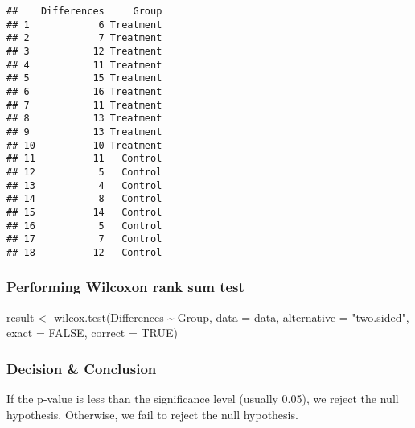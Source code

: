 \documentclass[
]{article}
\newenvironment{Shaded}{\begin{snugshade}}{\end{snugshade}}
\newcommand{\AttributeTok}[1]{\textcolor[rgb]{0.77,0.63,0.00}{#1}}
\newcommand{\ConstantTok}[1]{\textcolor[rgb]{0.00,0.00,0.00}{#1}}
\newcommand{\FunctionTok}[1]{\textcolor[rgb]{0.00,0.00,0.00}{#1}}
\newcommand{\NormalTok}[1]{#1}
\newcommand{\OtherTok}[1]{\textcolor[rgb]{0.56,0.35,0.01}{#1}}
\newcommand{\SpecialCharTok}[1]{\textcolor[rgb]{0.00,0.00,0.00}{#1}}
\newcommand{\StringTok}[1]{\textcolor[rgb]{0.31,0.60,0.02}{#1}}
\begin{document}
\begin{verbatim}
##    Differences     Group
## 1            6 Treatment
## 2            7 Treatment
## 3           12 Treatment
## 4           11 Treatment
## 5           15 Treatment
## 6           16 Treatment
## 7           11 Treatment
## 8           13 Treatment
## 9           13 Treatment
## 10          10 Treatment
## 11          11   Control
## 12           5   Control
## 13           4   Control
## 14           8   Control
## 15          14   Control
## 16           5   Control
## 17           7   Control
## 18          12   Control
\end{verbatim}

\hypertarget{performing-wilcoxon-rank-sum-test}{%
\subsubsection{Performing Wilcoxon rank sum
test}\label{performing-wilcoxon-rank-sum-test}}

\begin{Shaded}
\begin{Highlighting}[]
\NormalTok{result }\OtherTok{\textless{}{-}} \FunctionTok{wilcox.test}\NormalTok{(Differences }\SpecialCharTok{\textasciitilde{}}\NormalTok{ Group, }\AttributeTok{data =}\NormalTok{ data, }\AttributeTok{alternative =} \StringTok{"two.sided"}\NormalTok{, }\AttributeTok{exact =} \ConstantTok{FALSE}\NormalTok{, }\AttributeTok{correct =} \ConstantTok{TRUE}\NormalTok{)}
\end{Highlighting}
\end{Shaded}

\hypertarget{decision-conclusion-3}{%
\subsubsection{Decision \& Conclusion}\label{decision-conclusion-3}}

If the p-value is less than the significance level (usually 0.05), we
reject the null hypothesis. Otherwise, we fail to reject the null
hypothesis.
\end{document}
